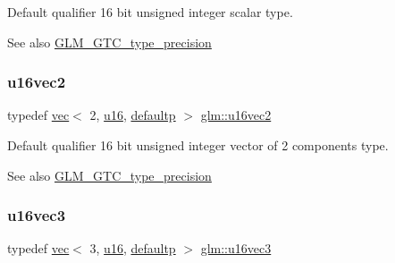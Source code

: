 Default qualifier 16 bit unsigned integer scalar type. \begin{DoxySeeAlso}{See also}
\mbox{\hyperlink{group__gtc__type__precision}{G\+L\+M\+\_\+\+G\+T\+C\+\_\+type\+\_\+precision}} 
\end{DoxySeeAlso}
\mbox{\label{group__gtc__type__precision_ga50bd2ceeb100a187e7c46f135269a0ec}} 
\subsubsection{\texorpdfstring{u16vec2}{u16vec2}}
{\footnotesize\ttfamily typedef \mbox{\hyperlink{structglm_1_1vec}{vec}}$<$ 2, \mbox{\hyperlink{group__gtc__type__precision_gae7a1571503f83d2264ddfa705a6b082a}{u16}}, \mbox{\hyperlink{namespaceglm_a36ed105b07c7746804d7fdc7cc90ff25a9d21ccd8b5a009ec7eb7677befc3bf51}{defaultp}} $>$ \mbox{\hyperlink{group__gtc__type__precision_ga50bd2ceeb100a187e7c46f135269a0ec}{glm\+::u16vec2}}}

Default qualifier 16 bit unsigned integer vector of 2 components type. \begin{DoxySeeAlso}{See also}
\mbox{\hyperlink{group__gtc__type__precision}{G\+L\+M\+\_\+\+G\+T\+C\+\_\+type\+\_\+precision}} 
\end{DoxySeeAlso}
\mbox{\label{group__gtc__type__precision_gad60f14d1abd39b480cbe5c5cf848071a}} 
\subsubsection{\texorpdfstring{u16vec3}{u16vec3}}
{\footnotesize\ttfamily typedef \mbox{\hyperlink{structglm_1_1vec}{vec}}$<$ 3, \mbox{\hyperlink{group__gtc__type__precision_gae7a1571503f83d2264ddfa705a6b082a}{u16}}, \mbox{\hyperlink{namespaceglm_a36ed105b07c7746804d7fdc7cc90ff25a9d21ccd8b5a009ec7eb7677befc3bf51}{defaultp}} $>$ \mbox{\hyperlink{group__gtc__type__precision_gad60f14d1abd39b480cbe5c5cf848071a}{glm\+::u16vec3}}}

